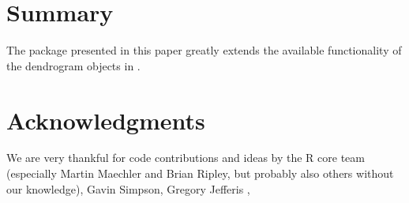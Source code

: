 \documentclass[shortnames,nojss,article]{jss}\usepackage{graphicx, color}
\begin{document}



\section{Summary}

The  package presented in this paper greatly extends the available functionality of the dendrogram objects in .

% 
% 



\section*{Acknowledgments}

We are very thankful for code contributions and ideas by the R core team (especially Martin Maechler and Brian Ripley, but probably also others without our knowledge), Gavin Simpson, Gregory Jefferis
,






\vspace*{-0.35cm}
\end{document}
